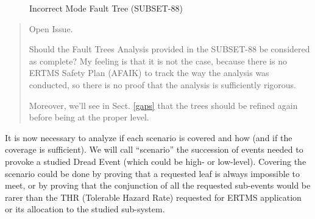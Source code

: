 \documentclass{template/openetcs_article}
\newenvironment{issue}{
	\begin{quote}
	\begin{itshape}Open Issue. 
}{
	\end{itshape}
	\end{quote}
}
\begin{document}
\begin{figure}
  \centering
  \caption{Incorrect Mode Fault Tree (SUBSET-88)}
  \label{fig:mode_fault_tree}
\end{figure}

\begin{issue}
Should the Fault Trees Analysis provided in the SUBSET-88 be considered as complete? My feeling is 
that it is not the case, because there is no ERTMS Safety Plan (AFAIK) to track the way the analysis 
was conducted, so there is no proof that the analysis is sufficiently rigorous.

Moreover, we'll see in Sect. \ref{gaps} that the trees should be refined again before being at the proper
level.
\end{issue}

It is now necessary to analyze if each scenario is covered and how (and if the coverage is sufficient).
We will call ``scenario'' the succession of events needed to provoke a studied Dread Event (which could
be high- or low-level). Covering the scenario could be done by proving that a requested leaf is always 
impossible to meet, or by proving that the conjunction of all the requested sub-events would be rarer 
than the THR (Tolerable Hazard Rate) requested for ERTMS application or its allocation to the studied 
sub-system.
\end{document}
